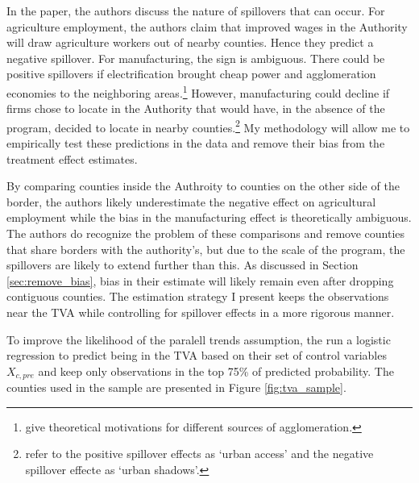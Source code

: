 \documentclass[11pt]{article}
\begin{document}
In the paper, the authors discuss the nature of spillovers that can occur. For agriculture employment, the authors claim that improved wages in the Authority will draw agriculture workers out of nearby counties. Hence they predict a negative spillover. For manufacturing, the sign is ambiguous. There could be positive spillovers if electrification brought cheap power and agglomeration economies to the neighboring areas.\footnote{\citet{Duranton_Puga_2003} give theoretical motivations for different sources of agglomeration.} However, manufacturing could decline if firms chose to locate in the Authority that would have, in the absence of the program, decided to locate in nearby counties.\footnote{\citet{Cuberes_Desmet_Rappaport_2021} refer to the positive spillover effects as `urban access' and the negative spillover effecte as `urban shadows'.} My methodology will allow me to empirically test these predictions in the data and remove their bias from the treatment effect estimates. 

By comparing counties inside the Authroity to counties on the other side of the border, the authors likely underestimate the negative effect on agricultural employment while the bias in the manufacturing effect is theoretically ambiguous. The authors do recognize the problem of these comparisons and remove counties that share borders with the authority's, but due to the scale of the program, the spillovers are likely to extend further than this. As discussed in Section \ref{sec:remove_bias}, bias in their estimate will likely remain even after dropping contiguous counties. The estimation strategy I present keeps the observations near the TVA while controlling for spillover effects in a more rigorous manner. 

To improve the likelihood of the paralell trends assumption, the run a logistic regression to predict being in the TVA based on their set of control variables $X_{c, pre}$ and keep only observations in the top 75\% of predicted probability. The counties used in the sample are presented in Figure \ref{fig:tva_sample}. 
\end{document}
